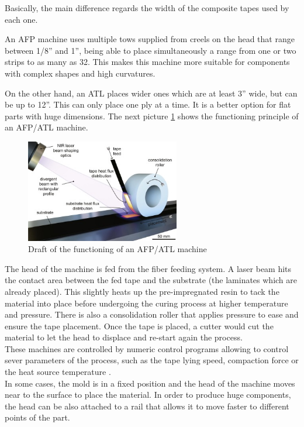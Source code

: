 Basically, the main difference regards the width of the composite tapes used by each one\cite{atl_afp}.

An AFP machine uses multiple tows supplied from creels on the head that range between 1/8” and 1”, being able to place simultaneously a range from one or two strips to as many as 32. This makes this machine more suitable for components with complex shapes and high curvatures.

On the other hand, an ATL places wider ones which are at least 3” wide, but can be up to 12”. This can only place one ply at a time. It is a better option for flat parts with huge dimensions. The next picture \ref{fig:afp-atl_machine} shows the functioning principle of an AFP/ATL machine.

\begin{figure}[h]
	\centering
	\includegraphics[width=0.6\textwidth]{img/afp_atl_machine.jpg}
	\caption{Draft of the functioning of an AFP/ATL machine}
	\label{fig:afp-atl_machine}
\end{figure}

The head of the machine is fed from the fiber feeding system. A laser beam hits the contact area between the fed tape and the substrate (the laminates which are already placed). This slightly heats up the pre-impregnated resin to tack the material into place before undergoing the curing process at higher temperature and pressure. There is also a consolidation roller that applies pressure to ease and ensure the tape placement. Once the tape is placed, a cutter would cut the material to let the head to displace and re-start again the process.\\

These machines are controlled by numeric control programs allowing to control sever parameters of the process, such as the tape lying speed, compaction force or the heat source temperature \cite{Kozaczuk2016}.\\

In some cases, the mold is in a fixed position and the head of the machine moves near to the surface to place the material. In order to produce huge components, the head can be also attached to a rail that allows it to move faster to different points of the part.\\

